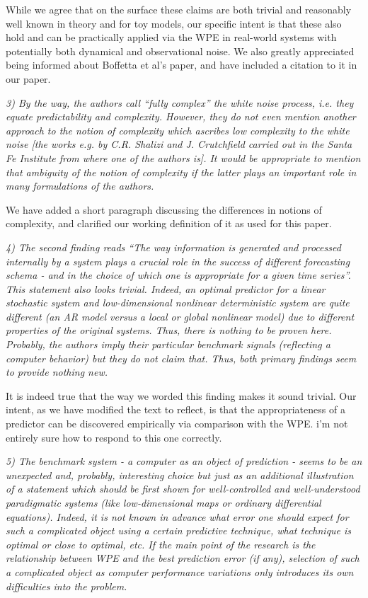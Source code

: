 \documentclass[12pt]{article}
\newcommand{\alert}[1]{{\color{red}#1}}
\begin{document}
While we agree that on the surface these claims are both trivial and reasonably
well known in theory and for toy models, our specific intent is that these also
hold and can be practically applied via the WPE in real-world systems with
potentially both dynamical and observational noise. We also greatly appreciated
being informed about Boffetta et al's paper, \alert{and have included a citation
to it in our paper.}

\emph{3) By the way, the authors call ``fully complex'' the white noise process,
i.e. they equate predictability and complexity. However, they do not even
mention another approach to the notion of complexity which ascribes low
complexity to the white noise [the works e.g. by C.R. Shalizi and J. Crutchfield
carried out in the Santa Fe Institute from where one of the authors is]. It
would be appropriate to mention that ambiguity of the notion of complexity if
the latter plays an important role in many formulations of the authors.}

\alert{We have added a short paragraph discussing the differences in notions of
complexity, and clarified our working definition of it as used for this paper.}

\emph{4) The second finding reads ``The way information is generated and
processed internally by a system plays a crucial role in the success of
different forecasting schema - and in the choice of which one is appropriate for
a given time series''. This statement also looks trivial. Indeed, an optimal
predictor for a linear stochastic system and low-dimensional nonlinear
deterministic system are quite different (an AR model versus a local or global
nonlinear model) due to different properties of the original systems. Thus,
there is nothing to be proven here. Probably, the authors imply their particular
benchmark signals (reflecting a computer behavior) but they do not claim that.
Thus, both primary findings seem to provide nothing new.}

It is indeed true that the way we worded this finding makes it sound trivial.
Our intent, as we have modified the text to reflect, is that the appropriateness
of a predictor can be discovered empirically via comparison with the WPE.
\alert{i'm not entirely sure how to respond to this one correctly.}

\emph{5) The benchmark system - a computer as an object of prediction - seems to
be an unexpected and, probably, interesting choice but just as an additional
illustration of a statement which should be first shown for well-controlled and
well-understood paradigmatic systems (like low-dimensional maps or ordinary
differential equations). Indeed, it is not known in advance what error one
should expect for such a complicated object using a certain predictive
technique, what technique is optimal or close to optimal, etc. If the main point
of the research is the relationship between WPE and the best prediction error
(if any), selection of such a complicated object as computer performance
variations only introduces its own difficulties into the problem.}
\end{document}
